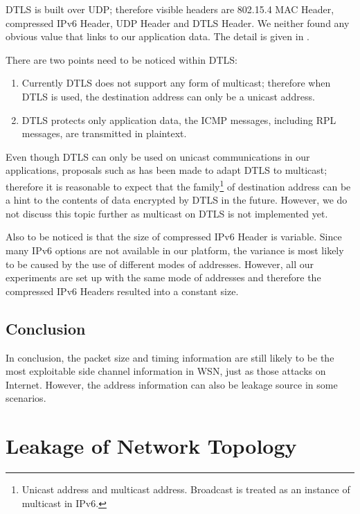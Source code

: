 DTLS is built over UDP; therefore visible headers are 802.15.4 MAC Header, compressed IPv6 Header, UDP Header and DTLS Header. We neither found any obvious value that links to our application data. The detail is given in . 

There are two points need to be noticed within DTLS:
\begin{enumerate}
	\item Currently DTLS does not support any form of multicast; therefore when DTLS is used, the destination address can only be a unicast address. 

	\item DTLS protects only application data, the ICMP messages, including RPL messages, are transmitted in plaintext.
\end{enumerate}

Even though DTLS can only be used on unicast communications in our applications, proposals such as \cite{DtlsMulticast1} \cite{DtlsMulticast2} has been made to adapt DTLS to multicast; therefore it is reasonable to expect that the family\footnote{Unicast address and multicast address. Broadcast is treated as an instance of multicast in IPv6.} of destination address can be a hint to the contents of data encrypted by DTLS in the future. However, we do not discuss this topic further as multicast on DTLS is not implemented yet.

Also to be noticed is that the size of compressed IPv6 Header is variable. Since many IPv6 options are not available in our platform, the variance is most likely to be caused by the use of different modes of addresses. However, all our experiments are set up with the same mode of addresses and therefore the compressed IPv6 Headers resulted into a constant size.

\subsection{Conclusion}

In conclusion, the packet size and timing information are still likely to be the most exploitable side channel information in WSN, just as those attacks on Internet. However, the address information can also be leakage source in some scenarios.

\section{Leakage of Network Topology} \label{Sec: Leakage of Network Topology}

